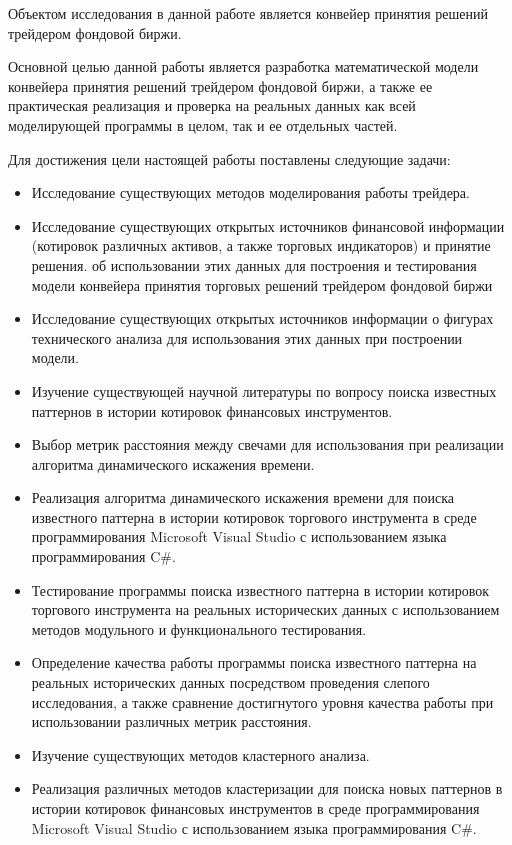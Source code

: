 \documentclass[12pt]{article}
\begin{document}
Объектом исследования в данной работе является конвейер принятия решений трейдером фондовой биржи.

Основной целью данной работы является разработка математической модели конвейера принятия решений трейдером фондовой биржи, а также ее практическая реализация и проверка на реальных данных как всей моделирующей программы в целом, так и ее отдельных частей.

Для достижения цели настоящей работы поставлены следующие задачи:

\begin{itemize}
\item Исследование существующих методов моделирования работы трейдера.
\item Исследование существующих открытых источников финансовой информации
(котировок различных активов, а также торговых индикаторов) и принятие решения.
об использовании этих данных для построения и тестирования модели конвейера принятия торговых решений трейдером фондовой биржи
\item Исследование существующих открытых источников информации о фигурах технического анализа для использования этих данных при построении модели.
\item Изучение существующей научной литературы по вопросу поиска известных паттернов в истории котировок финансовых инструментов.
\item Выбор метрик расстояния между свечами для использования при реализации алгоритма динамического искажения времени.
\item Реализация алгоритма динамического искажения времени для поиска известного паттерна в истории котировок торгового инструмента в среде программирования Microsoft Visual Studio с использованием языка программирования C\#.
\item Тестирование программы поиска известного паттерна в истории котировок торгового инструмента на реальных исторических данных с использованием методов модульного и функционального тестирования.
\item Определение качества работы программы поиска известного паттерна на реальных исторических данных посредством проведения слепого исследования, а также сравнение достигнутого уровня качества работы при использовании различных метрик расстояния.
\item Изучение существующих методов кластерного анализа.
\item Реализация различных методов кластеризации для поиска новых паттернов в истории котировок финансовых инструментов в среде программирования Microsoft Visual Studio с использованием языка программирования C\#.

\end{itemize}
\end{document}
